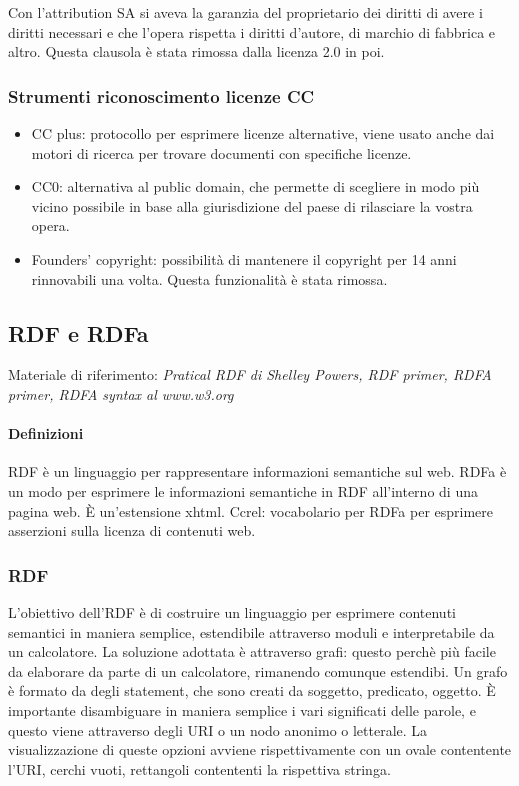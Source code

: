 Con l'attribution SA si aveva la garanzia del proprietario dei diritti di avere i diritti necessari e che l'opera rispetta i diritti d'autore, di marchio di fabbrica e altro. Questa clausola \`e stata rimossa dalla licenza 2.0 in poi.

\subsubsection{Strumenti riconoscimento licenze CC}
\begin{itemize}

\item CC plus: protocollo per esprimere licenze alternative, viene usato anche dai motori di ricerca per trovare documenti con specifiche licenze.
\item CC0: alternativa al public domain, che permette di scegliere in modo pi\`u vicino possibile in base alla giurisdizione del paese di rilasciare la vostra opera.
\item Founders' copyright: possibilit\`a di mantenere il copyright per 14 anni rinnovabili una volta. Questa funzionalit\`a \`e stata rimossa.

\end{itemize}

\subsection{RDF e RDFa}

Materiale di riferimento: \textit{Pratical RDF di Shelley Powers, RDF primer, RDFA primer, RDFA syntax al www.w3.org}

\paragraph*{Definizioni}RDF \`e un linguaggio per rappresentare informazioni semantiche sul web.
RDFa \`e un modo per esprimere le informazioni semantiche in RDF all'interno di una pagina web. \`E un'estensione xhtml.
Ccrel: vocabolario per RDFa per esprimere asserzioni sulla licenza di contenuti web.

\subsubsection{RDF}
L'obiettivo dell'RDF \`e di costruire un linguaggio per esprimere contenuti semantici in maniera semplice, estendibile attraverso moduli e interpretabile da un calcolatore.
La soluzione adottata \`e attraverso grafi: questo perch\`e pi\`u facile da elaborare da parte di un calcolatore, rimanendo comunque estendibi. Un grafo \`e formato da degli statement, che sono creati da soggetto, predicato, oggetto. \`E importante disambiguare in maniera semplice i vari significati delle parole, e questo viene attraverso degli URI o un nodo anonimo o letterale. La visualizzazione di queste opzioni avviene rispettivamente con un ovale contentente l'URI, cerchi vuoti, rettangoli contententi la rispettiva stringa.

